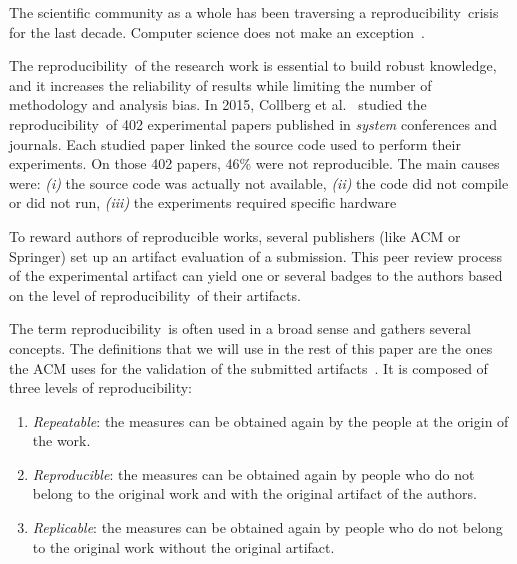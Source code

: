 \documentclass[sigconf,natbib=false]{acmart}
\newcommand{\repro}{reproducibility}
\begin{document}
The scientific community as a whole has been traversing a \repro\ crisis for the last decade.
Computer science does not make an exception\ \cite{randallIrreproducibilityCrisisModern2018,baker500ScientistsLift2016}.

The \repro\ of the research work is essential to build robust knowledge, and it increases the reliability of results while limiting the number of methodology and analysis bias.
In 2015, Collberg et al.\ \cite{collberg_repeatability_2015} studied the \repro\ of 402 experimental papers published in \emph{system} conferences and journals.
Each studied paper linked the source code used to perform their experiments. 
On those 402 papers, 46\% were not reproducible.
The main causes were:
\emph{(i)} the source code was actually not available,
\emph{(ii)} the code did not compile or did not run,
\emph{(iii)} the experiments required specific hardware

To reward authors of reproducible works, several publishers (like ACM or Springer) set up an artifact evaluation of a submission.
This peer review process of the experimental artifact can yield one or several badges to the authors based on the level of \repro\ of their artifacts.

The term \repro\ is often used in a broad sense and gathers several concepts.
The definitions that we will use in the rest of this paper are the ones the ACM uses for the validation of the submitted artifacts\ \cite{acm-badges}.
It is composed of three levels of \repro:

\begin{enumerate}
\item \emph{Repeatable}: the measures can be obtained again by the people at the origin of the work.
\item \emph{Reproducible}: the measures can be obtained again by people who do not belong to the original work and with the original artifact of the authors.
\item \emph{Replicable}: the measures can be obtained again by people who do not belong to the original work without the original artifact.
\end{enumerate}

\end{document}
